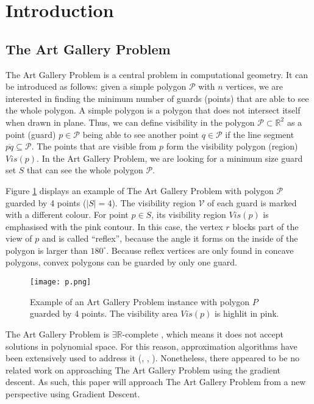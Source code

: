 \section{Introduction}

\subsection{The Art Gallery Problem \cite{o1987art}}

The Art Gallery Problem \cite{o1987art} is a central problem in computational geometry. It can be introduced as follows: given a simple polygon $\mathcal P$ with $n$ vertices, we are interested in finding the minimum number of guards (points) that are able to see the whole polygon. A simple polygon is a polygon that does not intersect itself when drawn in plane. Thus, we can define visibility in the polygon $\mathcal P \subset \mathbb R^2$ as a point (guard) $p \in \mathcal P$ being able to see another point $q \in \mathcal P$ if the line segment $\overline{pq} \subseteq \mathcal P$. The points that are visible from $p$ form the visibility polygon (region) $Vis(p)$. In the Art Gallery Problem, we are looking for a minimum size guard set $S$ that can see the whole polygon $\mathcal P$.

Figure \ref{fig:art} displays an example of The Art Gallery Problem \cite{o1987art} with polygon $\mathcal P$ guarded by 4 points ($|S| = 4$). The visibility region $\mathcal V$ of each guard is marked with a different colour. For point $p \in S$, its visibility region $Vis(p)$ is emphasised with the pink contour. In this case, the vertex $r$ blocks part of the view of $p$ and is called ``reflex'', because the angle it forms on the inside of the polygon is larger than $180^\circ$. Because reflex vertices are only found in concave polygons, convex polygons can be guarded by only one guard.

\begin{figure}[h!]
    \centering
    \texttt{[image: p.png]}
    \caption{Example of an Art Gallery Problem instance with polygon $P$ guarded by 4 points. The visibility area $Vis(p)$ is highlit in pink.}
    \label{fig:art}
\end{figure}

The Art Gallery Problem \cite{o1987art} is $\exists \mathbb R$-complete \cite{abrahamsen2021art}, which means it does not accept solutions in polynomial space. For this reason, approximation algorithms have been extensively used to address it (\cite{DBLP:journals/corr/BonnetM16b}, \cite{GHOSH2010718}, \cite{DBLP:journals/corr/abs-2007-06920}). Nonetheless, there appeared to be no related work on approaching The Art Gallery Problem \cite{o1987art} using the gradient descent. As such, this paper will approach The Art Gallery Problem \cite{o1987art} from a new perspective using Gradient Descent.

